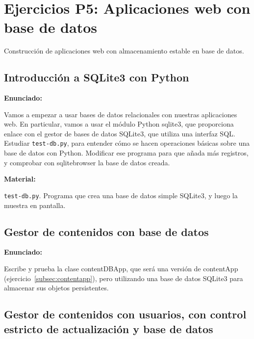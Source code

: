 \section{Ejercicios P5: Aplicaciones web con base de datos}

Construcción de aplicaciones web con almacenamiento estable en base de datos.

\subsection{Introducción a SQLite3 con Python}
\label{subsec:sqlite3-python}

\textbf{Enunciado:}

Vamos a empezar a usar bases de datos relacionales con nuestras aplicaciones web. En particular, vamos a usar el módulo Python sqlite3, que proporciona enlace con el gestor de bases de datos SQLite3, que utiliza una interfaz SQL. Estudiar \texttt{test-db.py}, para entender cómo se hacen operaciones básicas sobre una base de datos con Python. Modificar ese programa para que añada más registros, y comprobar con sqlitebrowser la base de datos creada.

\textbf{Material:}

\texttt{test-db.py}. Programa que crea una base de datos simple SQLite3, y luego la muestra en pantalla.

\subsection{Gestor de contenidos con base de datos}
\label{subsec:gestor-contenidos-bbdd}

\textbf{Enunciado:}

Escribe y prueba la clase contentDBApp, que será una versión de contentApp (ejercicio~\ref{subsec:contentapp}), pero utilizando una base de datos SQLite3 para almacenar sus objetos persistentes.

\subsection{Gestor de contenidos con usuarios, con control estricto de actualización y base de datos}
\label{subsec:gestor-contenidos-usuarios-bbdd}

